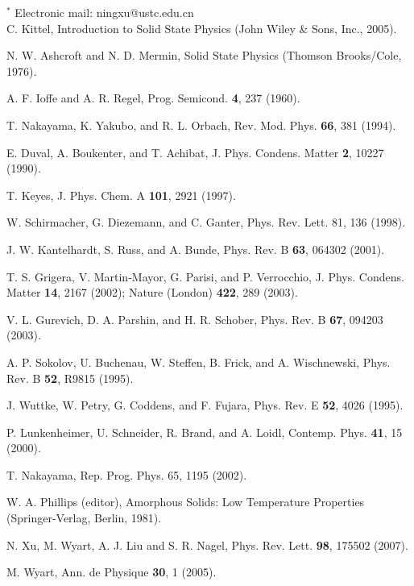 \documentclass[twocolumn,printnumbers,amsmath,amssymb,prl,verbatim]{revtex4}
\begin{document}
\begin{thebibliography}{50}

\item[$^*$]Electronic mail: ningxu@ustc.edu.cn\\

 C. Kittel, Introduction to Solid State Physics (John Wiley \& Sons, Inc., 2005).

 N. W. Ashcroft and N. D. Mermin, Solid State Physics (Thomson Brooks/Cole, 1976).

 A. F. Ioffe and A. R. Regel, Prog. Semicond. {\bf 4}, 237 (1960).

 T. Nakayama, K. Yakubo, and R. L. Orbach, Rev. Mod. Phys. {\bf 66}, 381 (1994).

 E. Duval, A. Boukenter, and T. Achibat, J. Phys. Condens. Matter {\bf 2}, 10227 (1990).

 T. Keyes, J. Phys. Chem. A {\bf 101}, 2921 (1997).

 W. Schirmacher, G. Diezemann, and C. Ganter, Phys. Rev. Lett. 81, 136 (1998).

 J. W. Kantelhardt, S. Russ, and A. Bunde, Phys. Rev. B {\bf 63}, 064302 (2001).

 T. S. Grigera, V. Martin-Mayor, G. Parisi, and P. Verrocchio, J. Phys. Condens. Matter {\bf 14}, 2167 (2002); Nature (London) {\bf 422}, 289 (2003).

 V. L. Gurevich, D. A. Parshin, and H. R. Schober, Phys. Rev. B {\bf 67}, 094203 (2003).

 A. P. Sokolov, U. Buchenau, W. Steffen, B. Frick, and A. Wischnewski, Phys. Rev. B {\bf 52}, R9815 (1995).

 J. Wuttke, W. Petry, G. Coddens, and F. Fujara, Phys. Rev. E {\bf 52}, 4026 (1995).

 P. Lunkenheimer, U. Schneider, R. Brand, and A. Loidl, Contemp. Phys. {\bf 41}, 15 (2000).

 T. Nakayama, Rep. Prog. Phys. 65, 1195 (2002).

 W. A. Phillips (editor), Amorphous Solids: Low Temperature Properties (Springer-Verlag, Berlin, 1981).

 N. Xu, M. Wyart, A. J. Liu and S. R. Nagel, Phys. Rev. Lett. {\bf 98}, 175502 (2007).

 M. Wyart, Ann. de Physique {\bf 30}, 1 (2005).


\end{thebibliography}
\end{document}

